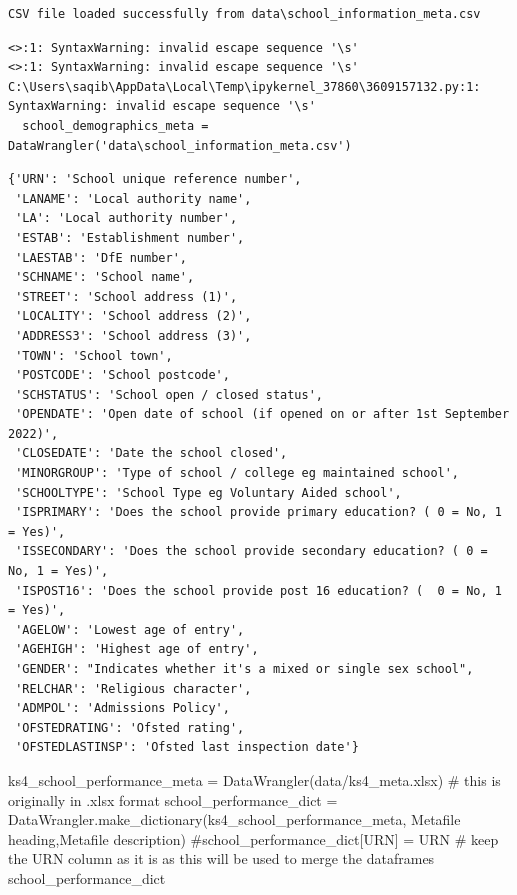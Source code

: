\documentclass[
  letterpaper,
  DIV=11,
  numbers=noendperiod]{scrartcl}
\newenvironment{Shaded}{\begin{snugshade}}{\end{snugshade}}
\newcommand{\CommentTok}[1]{\textcolor[rgb]{0.37,0.37,0.37}{#1}}
\newcommand{\NormalTok}[1]{\textcolor[rgb]{0.00,0.23,0.31}{#1}}
\newcommand{\OperatorTok}[1]{\textcolor[rgb]{0.37,0.37,0.37}{#1}}
\newcommand{\StringTok}[1]{\textcolor[rgb]{0.13,0.47,0.30}{#1}}
\begin{document}
\begin{verbatim}
CSV file loaded successfully from data\school_information_meta.csv
\end{verbatim}

\begin{verbatim}
<>:1: SyntaxWarning: invalid escape sequence '\s'
<>:1: SyntaxWarning: invalid escape sequence '\s'
C:\Users\saqib\AppData\Local\Temp\ipykernel_37860\3609157132.py:1: SyntaxWarning: invalid escape sequence '\s'
  school_demographics_meta = DataWrangler('data\school_information_meta.csv')
\end{verbatim}

\begin{verbatim}
{'URN': 'School unique reference number',
 'LANAME': 'Local authority name',
 'LA': 'Local authority number',
 'ESTAB': 'Establishment number',
 'LAESTAB': 'DfE number',
 'SCHNAME': 'School name',
 'STREET': 'School address (1)',
 'LOCALITY': 'School address (2)',
 'ADDRESS3': 'School address (3)',
 'TOWN': 'School town',
 'POSTCODE': 'School postcode',
 'SCHSTATUS': 'School open / closed status',
 'OPENDATE': 'Open date of school (if opened on or after 1st September 2022)',
 'CLOSEDATE': 'Date the school closed',
 'MINORGROUP': 'Type of school / college eg maintained school',
 'SCHOOLTYPE': 'School Type eg Voluntary Aided school',
 'ISPRIMARY': 'Does the school provide primary education? ( 0 = No, 1 = Yes)',
 'ISSECONDARY': 'Does the school provide secondary education? ( 0 = No, 1 = Yes)',
 'ISPOST16': 'Does the school provide post 16 education? (  0 = No, 1 = Yes)',
 'AGELOW': 'Lowest age of entry',
 'AGEHIGH': 'Highest age of entry',
 'GENDER': "Indicates whether it's a mixed or single sex school",
 'RELCHAR': 'Religious character',
 'ADMPOL': 'Admissions Policy',
 'OFSTEDRATING': 'Ofsted rating',
 'OFSTEDLASTINSP': 'Ofsted last inspection date'}
\end{verbatim}

\begin{Shaded}
\begin{Highlighting}[]
\NormalTok{ks4\_school\_performance\_meta }\OperatorTok{=}\NormalTok{ DataWrangler(}\StringTok{\textquotesingle{}data/ks4\_meta.xlsx\textquotesingle{}}\NormalTok{) }\CommentTok{\# this is originally in .xlsx format}
\NormalTok{school\_performance\_dict }\OperatorTok{=}\NormalTok{ DataWrangler.make\_dictionary(ks4\_school\_performance\_meta, }\StringTok{\textquotesingle{}Metafile heading\textquotesingle{}}\NormalTok{,}\StringTok{\textquotesingle{}Metafile description\textquotesingle{}}\NormalTok{)}
\CommentTok{\#school\_performance\_dict[\textquotesingle{}URN\textquotesingle{}] = \textquotesingle{}URN\textquotesingle{}  \# keep the URN column as it is as this will be used to merge the dataframes}
\NormalTok{school\_performance\_dict}
\end{Highlighting}
\end{Shaded}
\end{document}
